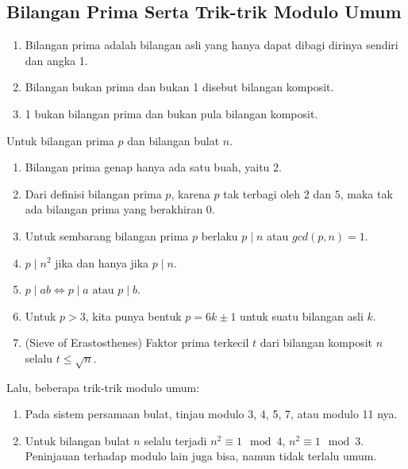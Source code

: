 \subsection{Bilangan Prima Serta Trik-trik Modulo Umum}
\begin{enumerate}
    \item Bilangan prima adalah bilangan asli yang hanya dapat dibagi dirinya sendiri dan angka 1. 
    \item Bilangan bukan prima dan bukan 1 disebut bilangan komposit.
    \item 1 bukan bilangan prima dan bukan pula bilangan komposit. 
\end{enumerate}

Untuk bilangan prima $p$ dan bilangan bulat $n$.
\begin{enumerate}
    \item Bilangan prima genap hanya ada satu buah, yaitu 2.
    \item Dari definisi bilangan prima $p$, karena $p$ tak terbagi oleh $2$ dan $5$, maka tak ada bilangan prima yang berakhiran $0$.
    \item Untuk sembarang bilangan prima $p$ berlaku $p \mid n$ atau $gcd(p,n)=1$.
    \item $p \mid n^2$ jika dan hanya jika $p \mid n$.
    \item $p \mid ab \iff p \mid a \text{ atau } p \mid b$.
    \item Untuk $p > 3$, kita punya bentuk $p = 6k \pm 1$ untuk suatu bilangan asli $k$.
    \item (Sieve of Erastosthenes) 
    Faktor prima terkecil $t$ dari bilangan komposit $n$ selalu $t \le \sqrt{n}$.
\end{enumerate}
    
Lalu, beberapa trik-trik modulo umum:
\begin{enumerate}
    \item Pada sistem persamaan bulat, tinjau modulo 3, 4, 5, 7, atau modulo 11 nya.
    \item Untuk bilangan bulat $n$ selalu terjadi $n^2 \equiv 1 \mod 4$, $n^2 \equiv 1 \mod 3$. Peninjauan terhadap modulo lain juga bisa, namun tidak terlalu umum.
\end{enumerate}

